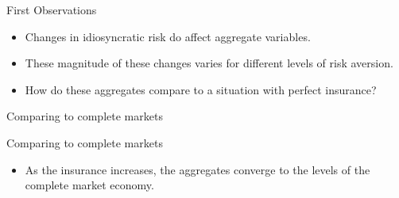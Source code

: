 \documentclass{beamer}
\begin{document}
\begin{frame}{First Observations}
	\begin{itemize}
	
	\item {
	Changes in idiosyncratic risk do affect aggregate variables.
	}

	\item {
	These magnitude of these changes varies for different levels of risk aversion.
	}
	
		\item {
	How do these aggregates compare to a situation with perfect insurance? 
	}

	\end{itemize}
	
\end{frame}
	

\begin{frame}{Comparing to complete markets}

\end{frame}
	
		
\begin{frame}{Comparing to complete markets}
	\begin{itemize}
	
	\item {
	As the insurance increases, the aggregates converge to the levels of the complete market economy. 
	}


	\end{itemize} 
\end{frame}
	
\end{document}
